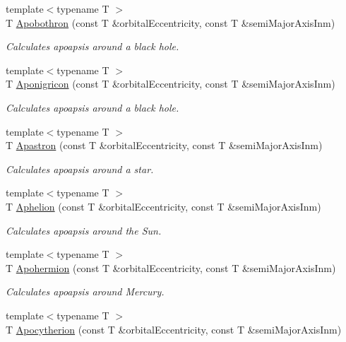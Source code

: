 \begin{DoxyCompactItemize}
{\footnotesize template$<$typename T $>$ }\\T \mbox{\hyperlink{group___e_g_x_phys-_apoapsis_ga95add3a7ff4e799bff0a508c9bdaa408}{Apobothron}} (const T \&orbital\+Eccentricity, const T \&semi\+Major\+Axis\+Inm)
\begin{DoxyCompactList}\small\item\em Calculates apoapsis around a black hole. \end{DoxyCompactList}\item 
{\footnotesize template$<$typename T $>$ }\\T \mbox{\hyperlink{group___e_g_x_phys-_apoapsis_gabceed387c4cdd53b8ccebafe2e8da8e1}{Aponigricon}} (const T \&orbital\+Eccentricity, const T \&semi\+Major\+Axis\+Inm)
\begin{DoxyCompactList}\small\item\em Calculates apoapsis around a black hole. \end{DoxyCompactList}\item 
{\footnotesize template$<$typename T $>$ }\\T \mbox{\hyperlink{group___e_g_x_phys-_apoapsis_ga809627c2522d7b4db0f27d6ea89e4f89}{Apastron}} (const T \&orbital\+Eccentricity, const T \&semi\+Major\+Axis\+Inm)
\begin{DoxyCompactList}\small\item\em Calculates apoapsis around a star. \end{DoxyCompactList}\item 
{\footnotesize template$<$typename T $>$ }\\T \mbox{\hyperlink{group___e_g_x_phys-_apoapsis_ga31b1bd55ee4ebe33f2af6827bfe30515}{Aphelion}} (const T \&orbital\+Eccentricity, const T \&semi\+Major\+Axis\+Inm)
\begin{DoxyCompactList}\small\item\em Calculates apoapsis around the Sun. \end{DoxyCompactList}\item 
{\footnotesize template$<$typename T $>$ }\\T \mbox{\hyperlink{group___e_g_x_phys-_apoapsis_ga50a476b4a3c9be6ded8308a247bf001c}{Apohermion}} (const T \&orbital\+Eccentricity, const T \&semi\+Major\+Axis\+Inm)
\begin{DoxyCompactList}\small\item\em Calculates apoapsis around Mercury. \end{DoxyCompactList}\item 
{\footnotesize template$<$typename T $>$ }\\T \mbox{\hyperlink{group___e_g_x_phys-_apoapsis_ga75bd80071f792bd75d609fec8dca17b1}{Apocytherion}} (const T \&orbital\+Eccentricity, const T \&semi\+Major\+Axis\+Inm)

\end{DoxyCompactItemize}
